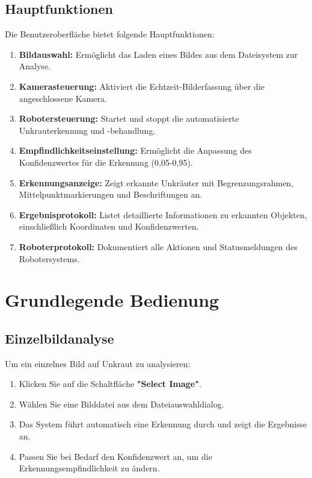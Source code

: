 \documentclass[12pt, a4paper]{scrreprt}
\begin{document}
\newpage

\subsection{Hauptfunktionen}
Die Benutzeroberfläche bietet folgende Hauptfunktionen:

\begin{enumerate}
    \item \textbf{Bildauswahl:} Ermöglicht das Laden eines Bildes aus dem Dateisystem zur Analyse.
    \item \textbf{Kamerasteuerung:} Aktiviert die Echtzeit-Bilderfassung über die angeschlossene Kamera.
    \item \textbf{Robotersteuerung:} Startet und stoppt die automatisierte Unkrauterkennung und -behandlung.
    \item \textbf{Empfindlichkeitseinstellung:} Ermöglicht die Anpassung des Konfidenzwertes für die Erkennung (0,05-0,95).
    \item \textbf{Erkennungsanzeige:} Zeigt erkannte Unkräuter mit Begrenzungsrahmen, Mittelpunktmarkierungen und Beschriftungen an.
    \item \textbf{Ergebnisprotokoll:} Listet detaillierte Informationen zu erkannten Objekten, einschließlich Koordinaten und Konfidenzwerten.
    \item \textbf{Roboterprotokoll:} Dokumentiert alle Aktionen und Statusmeldungen des Robotersystems.
\end{enumerate}

\section{Grundlegende Bedienung}

\subsection{Einzelbildanalyse}
Um ein einzelnes Bild auf Unkraut zu analysieren:
\begin{enumerate}
    \item Klicken Sie auf die Schaltfläche \textbf{"Select Image"}.
    \item Wählen Sie eine Bilddatei aus dem Dateiauswahldialog.
    \item Das System führt automatisch eine Erkennung durch und zeigt die Ergebnisse an.
    \item Passen Sie bei Bedarf den Konfidenzwert an, um die Erkennungsempfindlichkeit zu ändern.
\end{enumerate}
\end{document}
